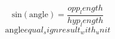 \[\text{{sin}}(\text{{{angle}}})=\frac{{{opp_length}}}{{{hyp_length}}}\]
\[\text{{{angle}}}{equal_sign}{result_with_unit}\]
